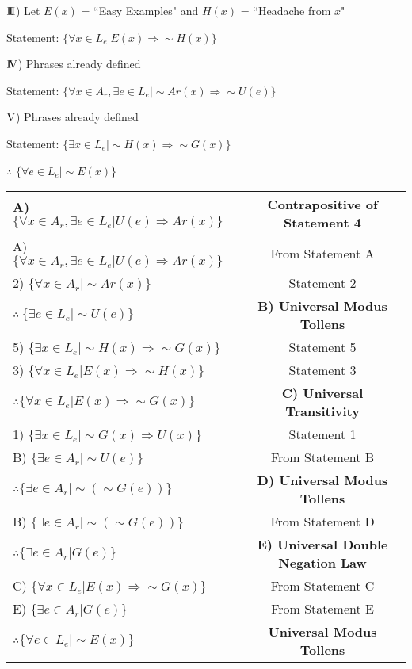 \documentclass[11pt]{article}
\begin{document}
\begin{flushleft}
${\rm I\!I\!I}$) Let $E(x)$ = ``Easy Examples" and $H(x)$ = ``Headache from $x$" 

Statement:  $\{ \forall x \in L_e | E(x) \Rightarrow \sim H(x)\}$ 

${\rm I\!V}$) Phrases already defined

Statement:  $\{ \forall x \in A_r, \exists e \in L_e | \sim Ar(x) \Rightarrow \sim U(e)   \}$

${\rm V}$) Phrases already defined

Statement:  $\{ \exists x \in L_e | \sim H(x) \Rightarrow  \sim G(x) \}$ 

$\therefore$ $\{ \forall  e \in L_e | \sim E(x)      \}$


\begin{center}
	\begin{tabular}{|l|c|} \hline
	
	A) $\{ \forall x \in A_r, \exists e \in L_e | U(e)   \Rightarrow  Ar(x) \}$	& \textbf{Contrapositive of Statement 4} \\ \hline
	A) $\{ \forall x \in A_r, \exists e \in L_e | U(e)   \Rightarrow  Ar(x) \}$	& From Statement A \\ 
	2) $\{ \forall x \in A_r | \sim Ar(x)\}$			& Statement 2 \\ 
   $\therefore \ \{\exists e \in L_e | \sim U(e)\}$& \textbf{B) Universal Modus Tollens} \\ \hline
	5) $\{ \exists x \in L_e | \sim H(x) \Rightarrow  \sim G(x) \}$ 		& Statement 5 \\
	3) $\{ \forall x \in L_e | E(x) \Rightarrow \sim H(x)\}$ 			& Statement 3 \\
	 $\therefore \{ \forall x \in L_e | E(x) \Rightarrow \sim G(x)\} $    & \textbf{C) Universal Transitivity} \\ \hline
	1) $\{ \exists x \in L_e | \sim G(x) \Rightarrow U(x)\}$		& Statement 1 \\
	B) $\{\exists e \in A_r | \sim U(e)\}$			& From Statement B \\
	$\therefore \{\exists e \in A_r | \sim (\sim G(e))\}$		& \textbf{D) Universal Modus Tollens} \\ \hline
	B) $\{\exists e \in A_r | \sim (\sim G(e))\}$				& From Statement D \\
	$\therefore \{\exists e \in A_r | G(e)\}$			& \textbf{E) Universal Double Negation Law} \\ \hline
	C) $\{ \forall x \in L_e | E(x) \Rightarrow \sim G(x)\}$  & From Statement C \\
	E) $\{\exists e \in A_r | G(e)\}$	& From Statement E \\
	$\therefore \{ \forall  e \in L_e | \sim E(x)\}$		& \textbf{ Universal Modus Tollens} \\ \hline
	

\end{tabular}
\end{center}
\end{flushleft}
\end{document}
